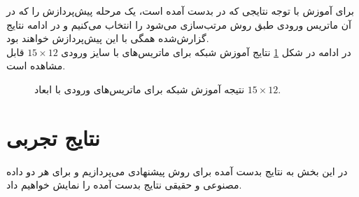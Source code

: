 برای آموزش با توجه نتایجی که در \cite{azer2020tumor} بدست آمده است، یک مرحله پیش‌پردازش را که در آن ماتریس ورودی طبق روش \cite{gusfield1997algorithms} مرتب‌سازی می‌شود را انتخاب می‌کنیم و در ادامه نتایج گزارش‌شده همگی با این پیش‌پردازش خواهند بود.
\\
در ادامه در شکل \ref{fig:ch_er:td3_learning} نتایج آموزش شبکه برای ماتریس‌های با سایز ورودی $15\times 12$ قابل مشاهده است.
\begin{figure}[!ht]
	\hfill
	\caption{نتیجه آموزش شبکه برای ماتریس‌های ورودی با ابعاد $15\times 12$.}
	\label{fig:ch_er:td3_learning}
\end{figure}



\newpage
\section{نتایج تجربی}
در این بخش به نتایج بدست آمده برای روش پیشنهادی می‌پردازیم و برای هر دو داده مصنوعی و حقیقی نتایج بدست آمده را نمایش خواهیم داد.
